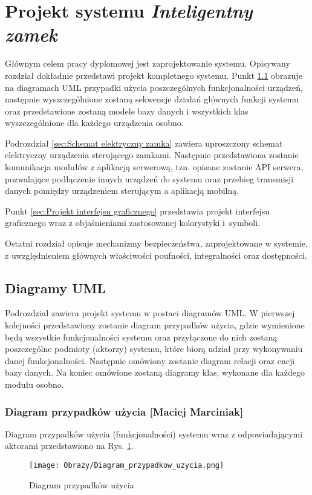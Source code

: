\documentclass[twoside,10pt]{article}
\def\NazwaSys {\textit{Inteligentny zamek}}
\begin{document}
\newpage\section{Projekt systemu \textsl{\NazwaSys}}\label{sec:projekt}
Głównym celem pracy dyplomowej jest zaprojektowanie systemu. Opisywany rozdział dokładnie przedstawi projekt kompletnego systemu. Punkt \ref {sec:Diagramy UML} obrazuje na diagramach UML przypadki użycia poszczególnych funkcjonalności urządzeń, następnie wyszczególnione zostaną sekwencje działań głównych funkcji systemu oraz przedstawione zostaną modele bazy danych i wszystkich klas wyszczególnione dla każdego urządzenia osobno. 

Podrozdział \ref {sec:Schemat elektryczny zamka} zawiera uproszczony schemat elektryczny urządzenia sterującego zamkami. Następnie przedstawiona zostanie komunikacja modułów z aplikacją serwerową, tzn. opisane zostanie API serwera, pozwalające podłączenie innych urządzeń do systemu oraz przebieg transmisji danych pomiędzy urządzeniem sterującym a aplikacją mobilną.

Punkt \ref{sec:Projekt interfejsu graficznego} przedstawia projekt interfejsu graficznego wraz z objaśnieniami zastosowanej kolorystyki i~symboli.

Ostatni rozdział opisuje mechanizmy bezpieczeństwa, zaprojektowane w systemie, z uwzględnieniem głównych właściwości poufności, integralności oraz dostępności.

\subsection{Diagramy UML}\label{sec:Diagramy UML}
Podrozdział zawiera projekt systemu w postaci diagramów UML. W pierwszej kolejności przedstawiony zostanie diagram przypadków użycia, gdzie wymienione będą wszystkie funkcjonalności systemu oraz przyłączone do nich zostaną poszczególne podmioty (aktorzy) systemu, które biorą udział przy wykonywaniu danej funkcjonalności. Następnie omówiony zostanie diagram relacji oraz encji bazy danych. Na koniec omówione zostaną diagramy klas, wykonane dla każdego modułu osobno. 
\subsubsection{Diagram przypadków użycia [Maciej Marciniak]}
Diagram przypadków użycia (funkcjonalności) systemu wraz z odpowiadającymi aktorami przedstawiono na Rys. \ref{diagram:diagram przypadków_użycia}.
\begin{landscape}
\begin{figure}[!h]
\centering
\texttt{[image: Obrazy/Diagram\_przypadkow\_uzycia.png]}
\caption{Diagram przypadków użycia}
\label{diagram:diagram przypadków_użycia}
\end{figure}
\end{landscape}
\newpage
\end{document}
